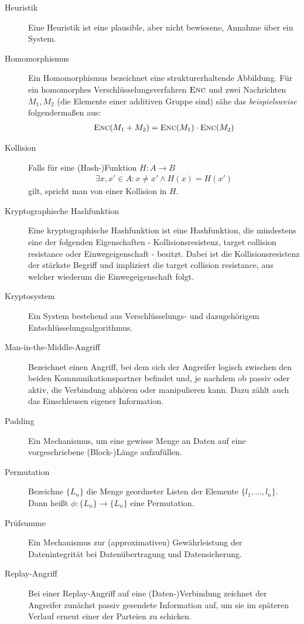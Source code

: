 \begin{description}
	\item[Heuristik] Eine Heuristik ist eine plausible, aber nicht bewiesene, Annahme über ein System.
	\item[Homomorphismus] Ein Homomorphismus bezeichnet eine strukturerhaltende Abbildung. Für ein homomorphes Verschlüsselungsverfahren $\textsc{Enc}$
	und zwei Nachrichten $M_1, M_2$ (die Elemente einer additiven Gruppe sind) sähe das \emph{beispielsweise} folgendermaßen aus:
	\begin{align*}
		\textsc{Enc}(M_1 + M_2) = \textsc{Enc}(M_1) \cdot \textsc{Enc}(M_2)
	\end{align*}
	\item[Kollision] Falls für eine (Hash-)Funktion $H\colon A \rightarrow B$
	\begin{align*}
		\exists x, x' \in A : x \neq x' \land H(x) = H(x') 
	\end{align*}
	gilt, spricht man von einer Kollision in $H$.
	\item[Kryptographische Hashfunktion] Eine kryptographische Hashfunktion ist eine Hashfunktion, die mindestens eine der folgenden Eigenschaften
	- Kollisionsresistenz, target collision resistance oder Einwegeigenschaft - besitzt. Dabei ist die Kollisionsresistenz der stärkste Begriff und impliziert
	die target collision resistance, aus welcher wiederum die Einwegeigenschaft folgt.
	\item[Kryptosystem] Ein System bestehend aus Verschlüsselungs- und dazugehörigem Entschlüsselungsalgorithmus.
	\item[Man-in-the-Middle-Angriff] Bezeichnet einen Angriff, bei dem sich der Angreifer logisch zwischen den beiden Kommunikationspartner befindet und,
	je nachdem ob passiv oder aktiv, die Verbindung abhören oder manipulieren kann. Dazu zählt auch das Einschleusen eigener Information.
	\item[Padding] Ein Mechanismus, um eine gewisse Menge an Daten auf eine vorgeschriebene (Block-)Länge aufzufüllen.
	\item[Permutation] Bezeichne $\{L_n\}$ die Menge geordneter Listen der Elemente $\{l_1, \dots, l_n\}$. Dann heißt $\phi\colon \{L_n\} \rightarrow \{L_n\}$ eine Permutation.
	\item[Prüfsumme] Ein Mechanismus zur (approximativen) Gewährleistung der Datenintegrität bei Datenübertragung und Datensicherung.
	\item[Replay-Angriff] Bei einer Replay-Angriff auf eine (Daten-)Verbindung zeichnet der Angreifer zunächst passiv gesendete Information auf, um
	sie im späteren Verlauf erneut einer der Parteien zu schicken.

\end{description}
